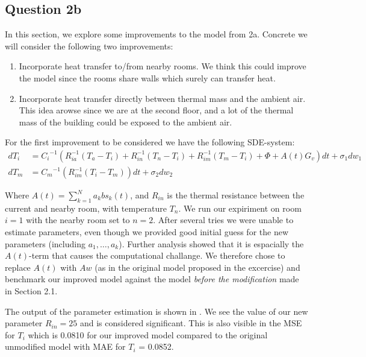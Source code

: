 \documentclass[a4paper]{article}
\begin{document}
\subsection{Question 2b}
In this section, we explore some improvements to the model from 2a. Concrete we will consider the following two improvements:

\begin{enumerate}
    \item Incorporate heat transfer to/from nearby rooms. We think this could improve the model since the rooms share walls which surely can transfer heat.
    \item Incorporate heat transfer directly between thermal mass and the ambient air. This idea arowse since we are at the second floor, and a lot of the thermal mass of the building could be exposed to the ambient air.
\end{enumerate}

For the first improvement to be considered we have the following SDE-system:
\begin{align}
    dT_i &= {C_i}^{-1} \left( R_{ia}^{-1} (T_a - T_i) + R_{in}^{-1} (T_n - T_i) + R_{im}^{-1} (T_m - T_i) + \Phi + A(t) G_v \right) \mathit{dt} + \sigma_1 \mathit{dw}_1 \\
    dT_m &= {C_m}^{-1} \left( R_{im}^{-1} (T_i - T_m) \right) \mathit{dt} + \sigma_2 \mathit{dw}_2 
\end{align}

Where $A(t) = \sum_{k = 1}^{N} a_k \mathit{bs}_k(t)$, and $R_{in}$ is the thermal resistance between the current and nearby room, with temperature $T_n$. We run our expiriment on room $i = 1$ with the nearby room set to $n = 2$. After several tries we were unable to estimate parameters, even though we provided good initial guess for the new parameters (including $a_1, \ldots, a_k$). Further analysis showed that it is espacially the $A(t)$-term that causes the computational challange. We therefore chose to replace $A(t)$ with $Aw$ (as in the original model proposed in the excercise) and benchmark our improved model against the model \emph{before the modification} made in Section 2.1. 

The output of the parameter estimation is shown in . We see the value of our new parameter $R_\mathit{in} = 25$ and is considered significant. This is also visible in the MSE for $T_i$ which is 0.0810 for our improved model compared to the original unmodified model with MAE for $T_i$  = 0.0852.
\end{document}
